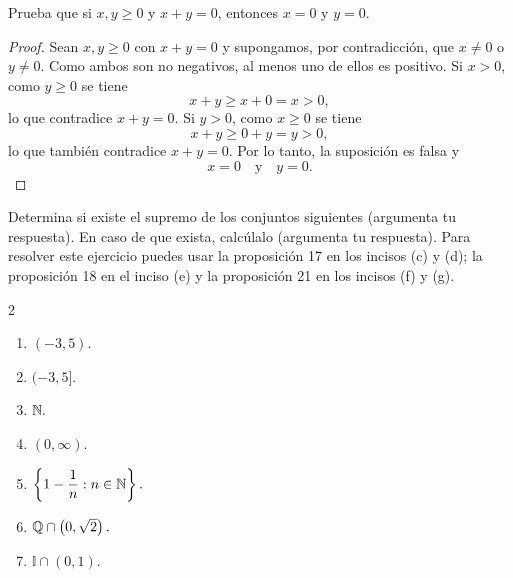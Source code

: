 \documentclass[12pt,a4paper]{article}
\newcommand{\llavesgrandes}[1]{\left\{#1\right\}}
\begin{document}
    \begin{problema}
        Prueba que si $x,y\geq0$ y $x+y=0$, entonces $x=0$ y $y=0$.
    \end{problema}

    \begin{proof}
        Sean $x,y\geq0$ con $x+y=0$ y supongamos, por contradicción, que $x\neq0$ o $y\neq0$. Como ambos son no negativos, al menos uno de ellos es positivo.
        Si $x\gt0$, como $y\geq0$ se tiene
        \begin{equation*}
            x+y\geq x+0=x\gt0,
        \end{equation*}
        lo que contradice $x+y=0$. Si $y\gt0$, como $x\geq0$ se tiene
        \begin{equation*}
            x+y\geq0+y=y\gt0,
        \end{equation*}
        lo que también contradice $x+y=0$. Por lo tanto, la suposición es falsa y
        \begin{equation*}
            x=0\quad\text{y}\quad y=0.
        \end{equation*}
    \end{proof}

    \begin{problema}
        Determina si existe el supremo de los conjuntos siguientes (argumenta tu respuesta). En caso de que exista, calcúlalo (argumenta tu respuesta).
        Para resolver este ejercicio puedes usar la proposición 17 en los incisos (c) y (d); la proposición 18 en el inciso (e) y la proposición 21 en los incisos (f) y (g).
        \begin{multicols}{2}
            \begin{enumerate}
                \item[(a)] $(-3,5).$
                \item[(b)] $(-3,5].$
                \item[(c)] $\mathbb{N}.$
                \item[(d)] $(0,\infty).$
                \item[(e)] $\llavesgrandes{1-\dfrac{1}{n}:n\in\N}.$
                \item[(f)] $\mathbb{Q}\cap\left(0,\sqrt{2}\right).$
                \item[(g)] $\mathbb{I}\cap(0,1).$
            \end{enumerate}
        \end{multicols}
    \end{problema}
\end{document}
